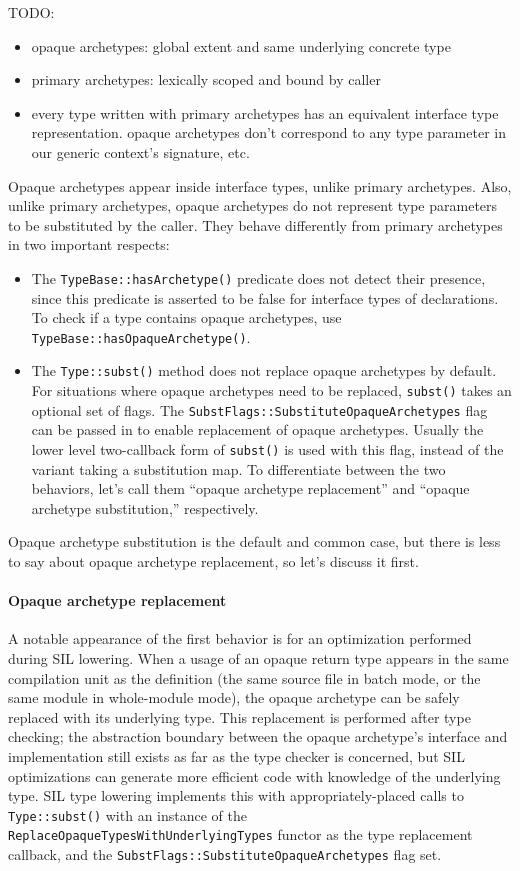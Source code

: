 \documentclass[../generics]{subfiles}
\begin{document}

TODO:
\begin{itemize}
\item opaque archetypes: global extent and same underlying concrete type 
\item primary archetypes: lexically scoped and bound by caller
\item every type written with primary archetypes has an equivalent interface type representation. opaque archetypes don't correspond to any type parameter in our generic context's signature, etc.
\end{itemize}

Opaque archetypes appear inside interface types, unlike primary archetypes. Also, unlike primary archetypes, opaque archetypes do not represent type parameters to be substituted by the caller. They behave differently from primary archetypes in two important respects:
\begin{itemize}
\item The \texttt{TypeBase::hasArchetype()} predicate does not detect their presence, since this predicate is asserted to be false for interface types of declarations. To check if a type contains opaque archetypes, use \texttt{TypeBase::hasOpaqueArchetype()}.

\item The \texttt{Type::subst()} method does not replace opaque archetypes by default. For situations where opaque archetypes need to be replaced, \texttt{subst()} takes an optional set of flags. The \texttt{SubstFlags::SubstituteOpaqueArchetypes} flag can be passed in to enable replacement of opaque archetypes. Usually the lower level two-callback form of \texttt{subst()} is used with this flag, instead of the variant taking a substitution map. To differentiate between the two behaviors, let's call them ``opaque archetype replacement'' and ``opaque archetype substitution,'' respectively.
\end{itemize}
Opaque archetype substitution is the default and common case, but there is less to say about opaque archetype replacement, so let's discuss it first.

\paragraph{Opaque archetype replacement} A notable appearance of the first behavior is for an optimization performed during SIL lowering. When a usage of an opaque return type appears in the same compilation unit as the definition (the same source file in batch mode, or the same module in whole-module mode), the opaque archetype can be safely replaced with its underlying type. This replacement is performed after type checking; the abstraction boundary between the opaque archetype's interface and implementation still exists as far as the type checker is concerned, but SIL optimizations can generate more efficient code with knowledge of the underlying type. SIL type lowering implements this with appropriately-placed calls to \texttt{Type::subst()} with an instance of the \texttt{ReplaceOpaqueTypesWithUnderlyingTypes} functor as the type replacement callback, and the \texttt{SubstFlags::SubstituteOpaqueArchetypes} flag set.
\end{document}
